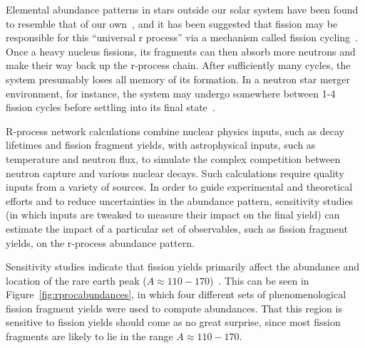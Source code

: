 Elemental abundance patterns in stars outside our solar system have been found to resemble that of our own~\cite{Arnould2007}, and it has been suggested that fission may be responsible for this ``universal r process'' via a mechanism called fission cycling~\cite{Beun2008}. Once a heavy nucleus fissions, its fragments can then absorb more neutrons and make their way back up the r-process chain. After sufficiently many cycles, the system presumably loses all memory of its formation. In a neutron star merger environment, for instance, the system may undergo somewhere between 1-4 fission cycles before settling into its final state~\cite{Mendoza2015}.

R-process network calculations combine nuclear physics inputs, such as decay lifetimes and fission fragment yields, with astrophysical inputs, such as temperature and neutron flux, to simulate the complex competition between neutron capture and various nuclear decays. Such calculations require quality inputs from a variety of sources. In order to guide experimental and theoretical efforts and to reduce uncertainties in the abundance pattern, sensitivity studies (in which inputs are tweaked to measure their impact on the final yield) can estimate the impact of a particular set of observables, such as fission fragment yields, on the r-process abundance pattern.

Sensitivity studies indicate that fission yields primarily affect the abundance and location of the rare earth peak ($A\approx110-170$)~\cite{Goriely2015a, Eichler2015}. This can be seen in Figure~\ref{fig:rprocabundances}, in which four different sets of phenomenological fission fragment yields were used to compute abundances. That this region is sensitive to fission yields should come as no great surprise, since most fission fragments are likely to lie in the range $A\approx110-170$.

